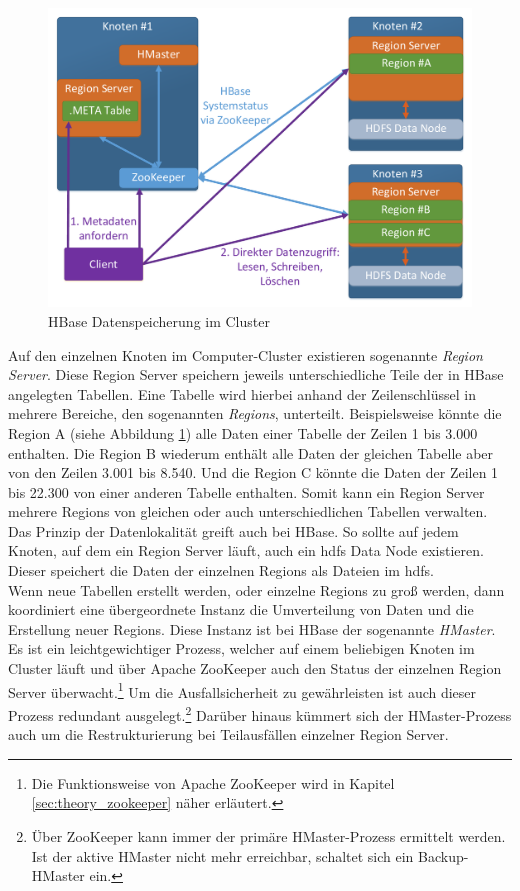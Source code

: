 \begin{figure}[ht]
  \centering
  \includegraphics[width=\textwidth]{./resource/hbase_cluster_architecture.pdf}
  \caption{HBase Datenspeicherung im Cluster}
  \label{fig:hbase_cluster_architecture}
\end{figure}

\noindent
Auf den einzelnen Knoten im Computer-Cluster existieren sogenannte \textit{Region Server}. Diese Region Server speichern jeweils unterschiedliche Teile der in HBase angelegten Tabellen. 
Eine Tabelle wird hierbei anhand der Zeilenschlüssel in mehrere Bereiche, den sogenannten \textit{Regions}, unterteilt. Beispielsweise könnte die Region A (siehe Abbildung \ref{fig:hbase_cluster_architecture}) alle Daten einer Tabelle der Zeilen 1 bis 3.000 enthalten. Die Region B wiederum enthält alle Daten der gleichen Tabelle aber von den Zeilen 3.001 bis 8.540. Und die Region C könnte die Daten der Zeilen 1 bis 22.300 von einer anderen Tabelle enthalten. Somit kann ein Region Server mehrere Regions von gleichen oder auch unterschiedlichen Tabellen verwalten.  Das Prinzip der Datenlokalität greift auch bei HBase. So sollte auf  jedem Knoten, auf dem ein Region Server läuft, auch ein \gls{hdfs} Data Node existieren. Dieser speichert die Daten der einzelnen Regions als Dateien im \gls{hdfs}.\\

\noindent
Wenn neue Tabellen erstellt werden, oder einzelne Regions zu groß werden, dann koordiniert eine übergeordnete Instanz die Umverteilung von Daten und die Erstellung neuer Regions. Diese Instanz ist bei HBase der sogenannte \textit{HMaster}. Es ist ein leichtgewichtiger Prozess, welcher auf einem beliebigen Knoten im Cluster läuft und über Apache ZooKeeper auch den Status der einzelnen Region Server überwacht.\footnote{Die Funktionsweise von Apache ZooKeeper wird in Kapitel \ref{sec:theory_zookeeper} näher erläutert.} Um die Ausfallsicherheit zu gewährleisten ist auch dieser Prozess redundant ausgelegt.\footnote{Über ZooKeeper kann immer der primäre HMaster-Prozess ermittelt werden. Ist der aktive HMaster nicht mehr erreichbar, schaltet sich ein Backup-HMaster ein.} Darüber hinaus kümmert sich der HMaster-Prozess auch um die Restrukturierung bei Teilausfällen einzelner Region Server. 

